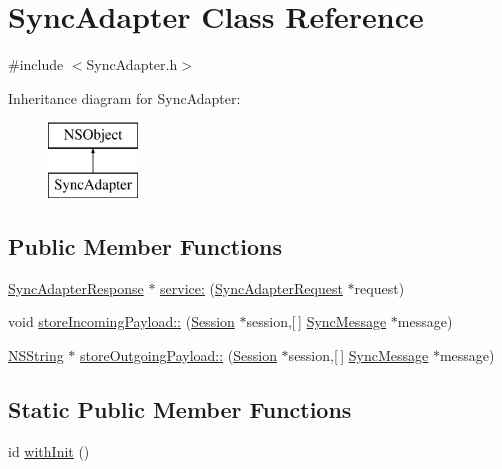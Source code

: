 \hypertarget{interface_sync_adapter}{
\section{\-Sync\-Adapter \-Class \-Reference}
\label{interface_sync_adapter}
}


{\ttfamily \#include $<$\-Sync\-Adapter.\-h$>$}

\-Inheritance diagram for \-Sync\-Adapter\-:\begin{figure}[H]
\begin{center}
\leavevmode
\includegraphics[height=2.000000cm]{interface_sync_adapter}
\end{center}
\end{figure}
\subsection*{\-Public \-Member \-Functions}
\begin{DoxyCompactItemize}
\item 
\hyperlink{interface_sync_adapter_response}{\-Sync\-Adapter\-Response} $\ast$ \hyperlink{interface_sync_adapter_a502a43e85f1178785f97ab6d54995693}{service\-:} (\hyperlink{interface_sync_adapter_request}{\-Sync\-Adapter\-Request} $\ast$request)
\item 
void \hyperlink{interface_sync_adapter_a8d77a46eed01fdbb148dc3fe0abc6fb1}{store\-Incoming\-Payload\-::} (\hyperlink{interface_session}{\-Session} $\ast$session,\mbox{[}$\,$\mbox{]} \hyperlink{interface_sync_message}{\-Sync\-Message} $\ast$message)
\item 
\hyperlink{class_n_s_string}{\-N\-S\-String} $\ast$ \hyperlink{interface_sync_adapter_ac0998e6ce8d081b6ef9be093e3433b2a}{store\-Outgoing\-Payload\-::} (\hyperlink{interface_session}{\-Session} $\ast$session,\mbox{[}$\,$\mbox{]} \hyperlink{interface_sync_message}{\-Sync\-Message} $\ast$message)
\end{DoxyCompactItemize}
\subsection*{\-Static \-Public \-Member \-Functions}
\begin{DoxyCompactItemize}
\item 
id \hyperlink{interface_sync_adapter_acd5a71ae6a4c01c61692189f1ee9a50b}{with\-Init} ()
\end{DoxyCompactItemize}


